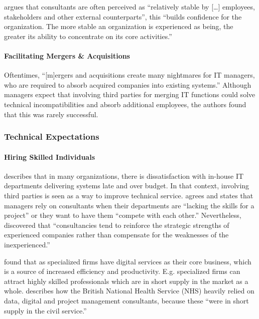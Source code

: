 \documentclass[12pt]{article}
\begin{document}
\citet[272-273]{furusten2009} argues that consultants are often
perceived as ``relatively stable by {[}\ldots{]} employees, stakeholders
and other external counterparts'', this ``builds confidence for the
organization. The more stable an organization is experienced as being,
the greater its ability to concentrate on its core activities.''

\paragraph{Facilitating Mergers \&
Acquisitions}\label{facilitating-mergers-acquisitions}

Oftentimes, ``{[}m{]}ergers and acquisitions create many nightmares for
IT managers, who are required to absorb acquired companies into existing
systems.'' \citep[ 12]{lacity1994} Although managers expect that
involving third parties for merging IT functions could solve technical
incompatibilities and absorb additional employees, the authors found
that this was rarely successful.

\subsubsection{Technical Expectations}\label{technical-expectations}

\paragraph{Hiring Skilled Individuals}\label{hiring-skilled-individuals}

\citet[12]{lacity1994} describes that in many organizations, there is
dissatisfaction with in-house IT departments delivering systems late and
over budget. In that context, involving third parties is seen as a way
to improve technical service. \citet[233]{sturdy1998} agrees and states
that managers rely on consultants when their departments are ``lacking
the skills for a project'' or they want to have them ``compete with each
other.'' Nevertheless, \citet[656]{wood1996} discovered that
``consultancies tend to reinforce the strategic strengths of experienced
companies rather than compensate for the weaknesses of the
inexperienced.''

\citet[52]{aubert1996} found that as specialized firms have digital
services as their core business, which is a source of increased
efficiency and productivity. E.g. specialized firms can attract highly
skilled professionals which are in short supply in the market as a
whole. \citet[28]{mazzucato2023} describes how the British National
Health Service (NHS) heavily relied on data, digital and project
management consultants, because these ``were in short supply in the
civil service.''
\end{document}
